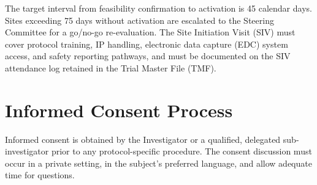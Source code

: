 \documentclass[11pt,a4paper]{scrreprt}
\begin{document}
\begin{center}
\end{center}

The target interval from feasibility confirmation to activation is 45 calendar days. Sites
exceeding 75 days without activation are escalated to the Steering Committee for a
go/no-go re-evaluation. The Site Initiation Visit (SIV) must cover protocol training, IP
handling, electronic data capture (EDC) system access, and safety reporting pathways, and
must be documented on the SIV attendance log retained in the Trial Master File (TMF).

\section{Informed Consent Process}

Informed consent is obtained by the Investigator or a qualified, delegated sub-investigator
prior to any protocol-specific procedure. The consent discussion must occur in a private
setting, in the subject's preferred language, and allow adequate time for questions.
\end{document}
